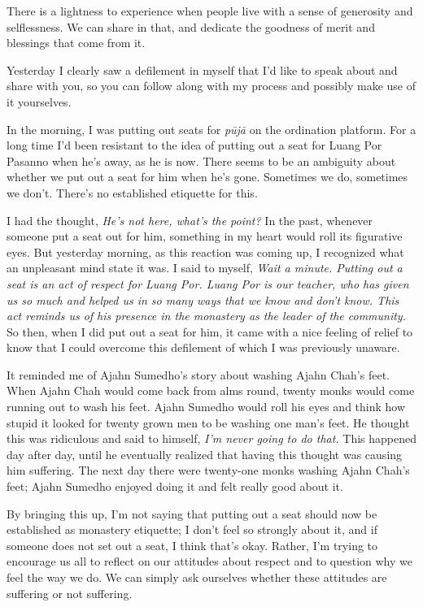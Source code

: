 There is a lightness to experience when people live with a sense of 
generosity and selflessness. We can share in that, and dedicate the 
goodness of merit and blessings that come from it.


Yesterday I clearly saw a defilement in myself that I'd like to speak 
about and share with you, so you can follow along with my process and 
possibly make use of it yourselves.

In the morning, I was putting out seats for \emph{pūjā} on the 
ordination platform. For a long time I'd been resistant to the idea of 
putting out a seat for Luang Por Pasanno when he's away, as he is now. 
There seems to be an ambiguity about whether we put out a seat for him 
when he's gone. Sometimes we do, sometimes we don't. There's no 
established etiquette for this.

I had the thought, \emph{He's not here, what's the point?} In the past, 
whenever someone put a seat out for him, something in my heart would 
roll its figurative eyes. But yesterday morning, as this reaction was 
coming up, I recognized what an unpleasant mind state it was. I said to 
myself, \emph{Wait a minute. Putting out a seat is an act of respect 
for Luang Por. Luang Por is our teacher, who has given us so much and 
helped us in so many ways that we know and don't know. This act reminds 
us of his presence in the monastery as the leader of the community.} So 
then, when I did put out a seat for him, it came with a nice feeling of 
relief to know that I could overcome this defilement of which I was 
previously unaware.

It reminded me of Ajahn Sumedho's story about washing Ajahn Chah's 
feet. When Ajahn Chah would come back from alms round, twenty monks 
would come running out to wash his feet. Ajahn Sumedho would roll his 
eyes and think how stupid it looked for twenty grown men to be washing 
one man's feet. He thought this was ridiculous and said to himself, 
\emph{I'm never going to do that.} This happened day after day, until 
he eventually realized that having this thought was causing him 
suffering. The next day there were twenty-one monks washing Ajahn 
Chah's feet; Ajahn Sumedho enjoyed doing it and felt really good about 
it.

By bringing this up, I'm not saying that putting out a seat should now 
be established as monastery etiquette; I don't feel so strongly about 
it, and if someone does not set out a seat, I think that's okay. 
Rather, I'm trying to encourage us all to reflect on our attitudes 
about respect and to question why we feel the way we do. We can simply 
ask ourselves whether these attitudes are suffering or not suffering.

